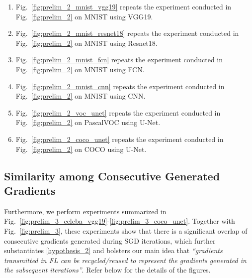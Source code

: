\begin{enumerate}[leftmargin=5mm]
    \item Fig.~\ref{fig:prelim_2_mnist_vgg19} repeats the experiment conducted in Fig.~\ref{fig:prelim_2} on MNIST using VGG19.
    \item Fig.~\ref{fig:prelim_2_mnist_resnet18} repeats the experiment conducted in Fig.~\ref{fig:prelim_2} on MNIST using Resnet18.
    \item Fig.~\ref{fig:prelim_2_mnist_fcn} repeats the experiment conducted in Fig.~\ref{fig:prelim_2} on MNIST using FCN.
    \item Fig.~\ref{fig:prelim_2_mnist_cnn} repeats the experiment conducted in Fig.~\ref{fig:prelim_2} on MNIST using CNN.
    
    \item Fig.~\ref{fig:prelim_2_voc_unet} repeats the experiment conducted in Fig.~\ref{fig:prelim_2} on PascalVOC using U-Net.
    \item Fig.~\ref{fig:prelim_2_coco_unet} repeats the experiment conducted in Fig.~\ref{fig:prelim_2} on COCO using U-Net.
\end{enumerate}



\subsection{Similarity among Consecutive Generated Gradients}
\label{app:prelim_expt_3}

Furthermore, we perform experiments summarized in Fig.~\ref{fig:prelim_3_celeba_vgg19}-\ref{fig:prelim_3_coco_unet}. Together with Fig.~\ref{fig:prelim_3}, these experiments show that there is a significant overlap of consecutive gradients generated during SGD iterations, which further substantiates \eqref{hypothesis_2} and bolsters our main idea that \textit{``gradients transmitted in FL can be recycled/reused to represent the gradients generated in the subsequent iterations''}. Refer below for the details of the figures.

